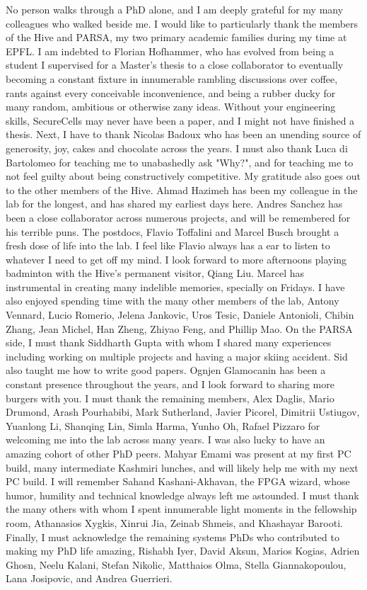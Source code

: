 No person walks through a PhD alone, and I am deeply grateful for my
many colleagues who walked beside me.
I would like to particularly thank the members of the Hive and PARSA, my two 
primary academic families during my time at EPFL. 
I am indebted to Florian Hofhammer, who has evolved from being a
student I supervised for a Master's thesis to a close collaborator to
eventually becoming a constant fixture in 
innumerable rambling discussions over coffee,
rants against every conceivable inconvenience, and 
being a rubber ducky for many random, ambitious or otherwise zany ideas.
Without your engineering skills, SecureCells may never have been a
paper, and I might not have finished a thesis.
Next, I have to thank Nicolas Badoux who has been an unending source of generosity, 
joy, cakes and chocolate across the years.
I must also thank Luca di Bartolomeo for teaching me to unabashedly ask "Why?",
and for teaching me to not feel guilty about being constructively competitive.
My gratitude also goes out to the other members of the Hive.
Ahmad Hazimeh has been my colleague in the lab for the longest, and has 
shared my earliest days here.
Andres Sanchez has been a close collaborator across numerous projects, and
will be remembered for his terrible puns.
The postdocs, Flavio Toffalini and Marcel Busch brought a fresh dose of life into the lab. 
I feel like Flavio always has a ear to listen to whatever I need to get off my mind.
I look forward to more afternoons playing badminton with the Hive's permanent
visitor, Qiang Liu.
Marcel has instrumental in creating many indelible memories, specially on Fridays.
I have also enjoyed spending time with the many other members of the lab, 
Antony Vennard, Lucio Romerio, Jelena Jankovic, Uros Tesic, Daniele Antonioli,
Chibin Zhang, Jean Michel, Han Zheng, Zhiyao Feng, and Phillip Mao.
On the PARSA side, I must thank Siddharth Gupta with
whom I shared many experiences including  
working on multiple projects and having a major skiing accident.
Sid also taught me how to write good papers.
Ognjen Glamocanin has been a constant presence throughout the years, and I 
look forward to sharing more burgers with you.
I must thank the remaining members, Alex Daglis, Mario Drumond, Arash Pourhabibi,
Mark Sutherland, Javier Picorel, Dimitrii Ustiugov,
Yuanlong Li, Shanqing Lin, Simla Harma, Yunho Oh, Rafael Pizzaro 
for welcoming me into the lab across many years.
I was also lucky to have an amazing cohort of other PhD peers.
Mahyar Emami was present at my first PC build, many intermediate Kashmiri lunches,
and will likely help me with my next PC build.
I will remember Sahand Kashani-Akhavan, the FPGA wizard, whose humor, 
humility and technical knowledge always left me astounded.
I must thank the many others with whom I spent innumerable light
moments in the fellowship room, Athanasios Xygkis, Xinrui Jia, 
Zeinab Shmeis, and Khashayar Barooti.
Finally, I must acknowledge the remaining systems PhDs who contributed to
making my PhD life amazing, Rishabh Iyer, David Aksun, Marios Kogias, Adrien Ghosn,
Neelu Kalani, Stefan Nikolic, Matthaios Olma, Stella Giannakopoulou,
Lana Josipovic,  and Andrea Guerrieri. 

